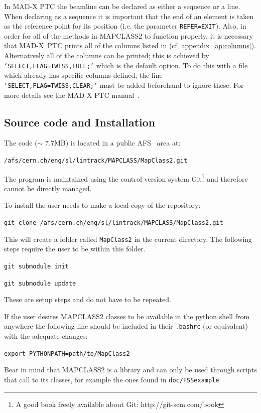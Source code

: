 \documentclass[a4paper]{cernatsnote}
\begin{document}
In \textsc{MAD-X PTC} the beamline can be declared as either a sequence
or a line. When declaring as a sequence it is important that the end
of an element is taken as the reference point for its position (i.e. the
parameter \texttt{REFER=EXIT}). Also, in order for all of the methods in
\textsc{MAPCLASS2} to function properly, it is necessary that MAD-X~PTC
prints all of the columns listed in (cf. appendix~\ref{ap:columns}).
Alternatively all of the columns can be printed; this is achieved by
\texttt{`SELECT,FLAG=TWISS,FULL;'} which is the default option. To do
this with a file which already has specific columns defined, the line
\texttt{`SELECT,FLAG=TWISS,CLEAR;'} must be added beforehand to ignore
these. For more details see the \textsc{MAD-X PTC} manual~\cite{madx}.

\subsection{Source code and Installation}
\def \codelocation {/afs/cern.ch/eng/sl/lintrack/MAPCLASS/MapClass2.git}

The code ($\sim$ 7.7MB) is located in a public AFS~\cite{afs} area at:

\texttt{\codelocation}

The program is maintained using the control version system
Git\footnote{A good book freely available about Git: http://git-scm.com/book}
\cite{git} and therefore cannot be directly managed.

To install the user needs to make a local copy of the repository:

\texttt{git clone \codelocation}

This will create a folder called \texttt{MapClass2} in the current
directory. The following steps require the user to be within this
folder.

\texttt{git submodule init}

\texttt{git submodule update}

These are setup steps and do not have to be repeated.

If the user desires \textsc{MAPCLASS2} classes to be available in the
python shell from anywhere the following line should be included in
their \texttt{.bashrc} (or equivalent) with the adequate changes:

\texttt{export PYTHONPATH=path/to/MapClass2}

Bear in mind that \textsc{MAPCLASS2} is a library and can only be used
through scripts that call to its classes, for example the ones found
in \texttt{doc/FSSexample}.
\end{document}

